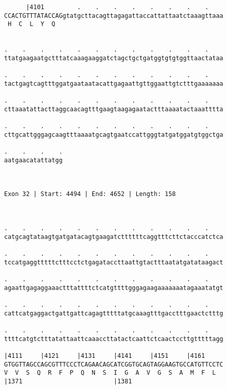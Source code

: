 \documentclass{article}
\begin{document}
\begin{Verbatim}
      |4101         .    .    .    .    .    .    .    .    
CCACTGTTTATACCAGgtatgcttacagttagagattaccattattaatctaaagttaaa
 H  C  L  Y  Q                                              
                                                            
  
.    .    .    .    .    .    .    .    .    .    .    .    
ttatgaagaatgctttatcaaagaaggatctagctgctgatggtgtgtggttaactataa
                                                            
.    .    .    .    .    .    .    .    .    .    .    .    
tactgagtcagtttggatgaataatacattgagaattgttggaattgtctttgaaaaaaa
                                                            
.    .    .    .    .    .    .    .    .    .    .    .    
cttaaatattacttaggcaacagtttgaagtaagagaatactttaaaatactaaatttta
                                                            
.    .    .    .    .    .    .    .    .    .    .    .    
cttgcattgggagcaagtttaaaatgcagtgaatccattgggtatgatggatgtggctga
                                                            
.    .    .    .
aatgaacatattatgg
                
                
 
Exon 32 | Start: 4494 | End: 4652 | Length: 158



.    .    .    .    .    .    .    .    .    .    .    .    
catgcagtataagtgatgatacagtgaagatcttttttcaggtttcttctacccatctca
                                                            
.    .    .    .    .    .    .    .    .    .    .    .    
tccatgaggtttttctttcctctgagataccttaattgtactttaatatgatataagact
                                                            
.    .    .    .    .    .    .    .    .    .    .    .    
agaattgagaggaaactttattttctcatgttttgggagaagaaaaaaatagaaatatgt
                                                            
.    .    .    .    .    .    .    .    .    .    .    .    
cattcatgaggactgattgattcagagtttttatgcaaagtttgacctttgaactctttg
                                                            
.    .    .    .    .    .    .    .    .    .    .    .    
ttttcatgtctttatattaattcaaaccttatactcaattctcaactccttgtttttagg
                                                            
|4111     |4121     |4131     |4141     |4151     |4161     
GTGGTTAGCCAGCGTTTCCCTCAGAACAGCATCGGTGCAGTAGGAAGTGCCATGTTCCTC
V  V  S  Q  R  F  P  Q  N  S  I  G  A  V  G  S  A  M  F  L  
|1371                         |1381                         
  

\end{Verbatim}
\end{document}
